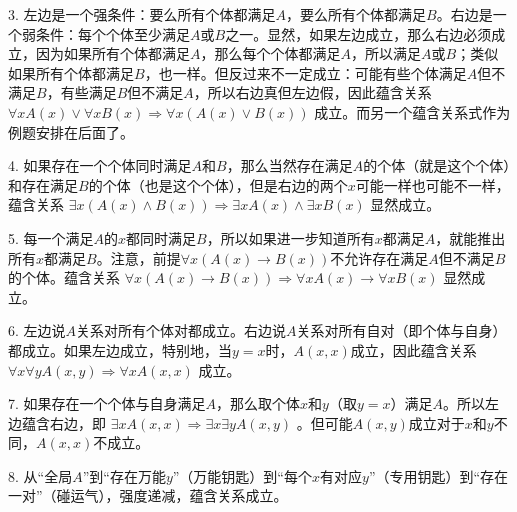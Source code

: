 3. 左边是一个强条件：要么所有个体都满足$A$，要么所有个体都满足$B$。右边是一个弱条件：每个个体至少满足$A$或$B$之一。显然，如果左边成立，那么右边必须成立，因为如果所有个体都满足$A$，那么每个个体都满足$A$，所以满足$A$或$B$；类似如果所有个体都满足$B$，也一样。但反过来不一定成立：可能有些个体满足$A$但不满足$B$，有些满足$B$但不满足$A$，所以右边真但左边假，因此蕴含关系 $\forall xA(x)\lor \forall xB(x)\Rightarrow \forall x(A(x)\lor B(x))$ 成立。而另一个蕴含关系式作为例题安排在后面了。

4. 如果存在一个个体同时满足$A$和$B$，那么当然存在满足$A$的个体（就是这个个体）和存在满足$B$的个体（也是这个个体），但是右边的两个$x$可能一样也可能不一样，蕴含关系 $\exists x(A(x)\land B(x))\Rightarrow \exists xA(x)\land \exists xB(x)$ 显然成立。

5. 每一个满足$A$的$x$都同时满足$B$，所以如果进一步知道所有$x$都满足$A$，就能推出所有$x$都满足$B$。注意，前提$\forall x(A(x)\to B(x))$不允许存在满足$A$但不满足$B$的个体。蕴含关系 $\forall x(A(x)\to B(x))\Rightarrow \forall xA(x)\to \forall xB(x)$ 显然成立。

6. 左边说$A$关系对所有个体对都成立。右边说$A$关系对所有自对（即个体与自身）都成立。如果左边成立，特别地，当$y=x$时，$A(x,x)$成立，因此蕴含关系 $\forall x\forall yA(x,y)\Rightarrow \forall xA(x,x)$ 成立。

7. 如果存在一个个体与自身满足$A$，那么取个体$x$和$y$（取$y=x$）满足$A$。所以左边蕴含右边，即 $\exists xA(x,x)\Rightarrow \exists x\exists yA(x,y)$ 。但可能$A(x,y)$成立对于$x$和$y$不同，$A(x,x)$不成立。

8. 从“全局$A$”到“存在万能$y$”（万能钥匙）到“每个$x$有对应$y$”（专用钥匙）到“存在一对”（碰运气），强度递减，蕴含关系成立。


